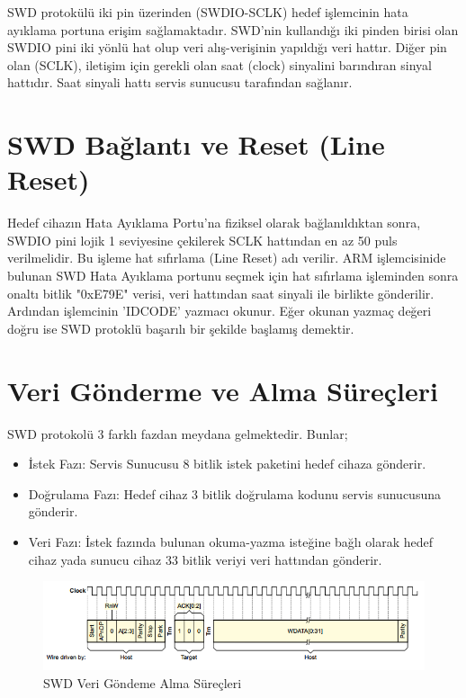 SWD protokülü iki pin üzerinden (SWDIO-SCLK) hedef işlemcinin hata ayıklama portuna erişim sağlamaktadır. SWD'nin kullandığı iki pinden birisi olan SWDIO pini iki yönlü hat olup
veri alış-verişinin yapıldığı veri hattır. Diğer pin olan (SCLK), iletişim için gerekli olan saat (clock) sinyalini barındıran sinyal hattıdır. Saat sinyali hattı servis sunucusu tarafından sağlanır.

\section{SWD Bağlantı ve Reset (Line Reset)}

Hedef cihazın Hata Ayıklama Portu'na fiziksel olarak bağlanıldıktan sonra, SWDIO pini lojik 1 seviyesine çekilerek SCLK hattından en az 50 puls verilmelidir. Bu işleme hat sıfırlama (Line Reset) adı verilir.
ARM işlemcisinide bulunan SWD Hata Ayıklama portunu seçmek için hat sıfırlama işleminden sonra onaltı bitlik "0xE79E" verisi, veri hattından saat sinyali ile birlikte gönderilir. Ardından
işlemcinin 'IDCODE' yazmacı okunur. Eğer okunan yazmaç değeri doğru ise SWD protoklü başarılı bir şekilde başlamış demektir.

\section{Veri Gönderme ve Alma Süreçleri}

SWD protokolü 3 farklı fazdan meydana gelmektedir. Bunlar;
\begin{itemize}
	\item İstek Fazı: Servis Sunucusu 8 bitlik istek paketini hedef cihaza gönderir.
	\item Doğrulama Fazı: Hedef cihaz 3 bitlik doğrulama kodunu servis sunucusuna gönderir.
	\item Veri Fazı: İstek fazında bulunan okuma-yazma isteğine bağlı olarak hedef cihaz yada sunucu cihaz 33 bitlik veriyi veri hattından gönderir.
\end{itemize}


\begin{figure}[h]
\centering
\includegraphics[width=\textwidth]{gorseller/swd}
\caption{SWD Veri Göndeme Alma Süreçleri}\label{fig:swdPhase}
\end{figure}

